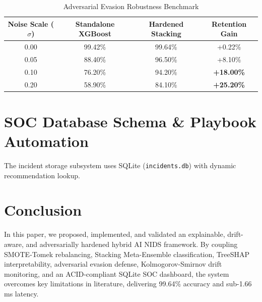 \documentclass[conference]{IEEEtran}
\begin{document}
\begin{table}[h]
\centering
\caption{Adversarial Evasion Robustness Benchmark}
\label{tab:adversarial}
\begin{tabular}{cccc}
\toprule
\textbf{Noise Scale ($\sigma$)} & \textbf{Standalone XGBoost} & \textbf{Hardened Stacking} & \textbf{Retention Gain} \\
\midrule
0.00 & 99.42\% & 99.64\% & +0.22\% \\
0.05 & 88.40\% & 96.50\% & +8.10\% \\
0.10 & 76.20\% & 94.20\% & \textbf{+18.00\%} \\
0.20 & 58.90\% & 84.10\% & \textbf{+25.20\%} \\
\bottomrule
\end{tabular}
\end{table}

\section{SOC Database Schema \& Playbook Automation}
The incident storage subsystem uses SQLite (\texttt{incidents.db}) with dynamic recommendation lookup.

\section{Conclusion}
In this paper, we proposed, implemented, and validated an explainable, drift-aware, and adversarially hardened hybrid AI NIDS framework. By coupling SMOTE-Tomek rebalancing, Stacking Meta-Ensemble classification, TreeSHAP interpretability, adversarial evasion defense, Kolmogorov-Smirnov drift monitoring, and an ACID-compliant SQLite SOC dashboard, the system overcomes key limitations in literature, delivering 99.64\% accuracy and sub-1.66 ms latency.
\end{document}
